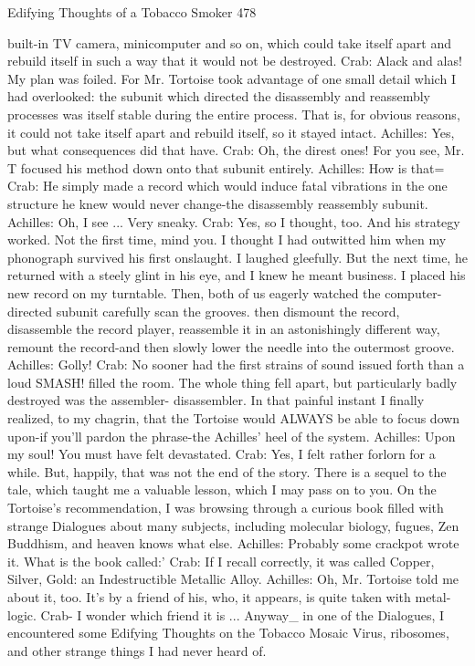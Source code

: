 {Edifying Thoughts of a Tobacco Smoker                                                 478

built-in TV camera, minicomputer and so on, which could take itself apart and rebuild
   itself in such a way that it would not be destroyed.
Crab: Alack and alas! My plan was foiled. For Mr. Tortoise took advantage of one small
   detail which I had overlooked: the subunit which directed the disassembly and
   reassembly processes was itself stable during the entire process. That is, for obvious
   reasons, it could not take itself apart and rebuild itself, so it stayed intact.
Achilles: Yes, but what consequences did that have.
Crab: Oh, the direst ones! For you see, Mr. T focused his method down onto that subunit
   entirely.
Achilles: How is that=
Crab: He simply made a record which would induce fatal vibrations in the one structure
   he knew would never change-the disassembly reassembly subunit.
Achilles: Oh, I see ... Very sneaky.
Crab: Yes, so I thought, too. And his strategy worked. Not the first time, mind you. I
   thought I had outwitted him when my phonograph survived his first onslaught. I
   laughed gleefully. But the next time, he returned with a steely glint in his eye, and I
   knew he meant business. I placed his new record on my turntable. Then, both of us
   eagerly watched the computer-directed subunit carefully scan the grooves. then
   dismount the record, disassemble the record player, reassemble it in an astonishingly
   different way, remount the record-and then slowly lower the needle into the outermost
   groove.
Achilles: Golly!
Crab: No sooner had the first strains of sound issued forth than a loud SMASH! filled the
   room. The whole thing fell apart, but particularly badly destroyed was the assembler-
   disassembler. In that painful instant I finally realized, to my chagrin, that the Tortoise
   would ALWAYS be able to focus down upon-if you'll pardon the phrase-the Achilles'
   heel of the system.
Achilles: Upon my soul! You must have felt devastated.
Crab: Yes, I felt rather forlorn for a while. But, happily, that was not the end of the story.
   There is a sequel to the tale, which taught me a valuable lesson, which I may pass on
   to you. On the Tortoise's recommendation, I was browsing through a curious book
   filled with strange Dialogues about many subjects, including molecular biology,
   fugues, Zen Buddhism, and heaven knows what else.
Achilles: Probably some crackpot wrote it. What is the book called:'
Crab: If I recall correctly, it was called Copper, Silver, Gold: an Indestructible Metallic
   Alloy.
Achilles: Oh, Mr. Tortoise told me about it, too. It's by a friend of his, who, it appears, is
   quite taken with metal-logic.
Crab- I wonder which friend it is ... Anyway\_ in one of the Dialogues, I encountered
   some Edifying Thoughts on the Tobacco Mosaic Virus, ribosomes, and other strange
   things I had never heard of.




}
